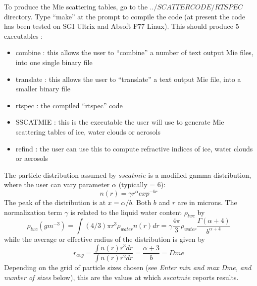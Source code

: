 \documentclass[12pt]{article}
\begin{document}
To produce the Mie scattering tables, go to the $../SCATTERCODE/RTSPEC$ 
directory. Type ``make'' at the prompt to compile the code (at present the
code has been tested on SGI Ultrix and Absoft F77 Linux).
This should produce 5 executables :\\
\begin{itemize}
\item combine : this allows the user to ``combine'' a number of text output
                Mie files, into one single binary file
\item translate : this allows the user to ``translate'' a text output
                Mie file, into a smaller binary file
\item rtspec : the compiled ``rtspec'' code
\item SSCATMIE : this is the executable the user will use to generate Mie
                 scattering tables of ice, water clouds or aerosols
\item refind : the user can use this to compute refractive indices of ice, 
               water clouds or aerosols
\end{itemize}

The particle distribution assumed by $sscatmie$ is a modified gamma 
distribution, where the user can vary parameter $\alpha$ (typically = 6): 
\[
n(r) = \gamma r^{\alpha} exp^{-br}
\]
The peak of the distribution is at $x = \alpha/b$. Both $b$ and $r$ are in 
microns. The normalization term $\gamma$ is related to the liquid water 
content $\rho_{lwc}$ by
\[
\rho_{lwc} (g m^{-3}) = \int (4/3)\pi r^3 \rho_{water} n(r) dr = 
\gamma  \frac{4 \pi}{3} \rho_{water} \frac{\Gamma(\alpha+4)}{b^{\alpha+4}}
\]
while the average or effective radius of the distribution is given by
\[
r_{avg} = \frac{\int n(r) r^3 dr}{\int n(r) r^2 dr} = \frac{\alpha+3}{b} = Dme
\]
Depending on the grid of particle sizes chosen (see {\em Enter min and max 
Dme, and number of sizes} below), this are the values at which $sscatmie$ 
reports results. 
\end{document}
